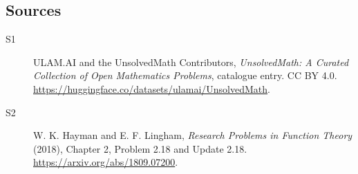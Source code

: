\documentclass[11pt]{article}
\begin{document}
\subsection{Sources}
\begin{description}
\item[\hypertarget{source:statement:1}{S1}] ULAM.AI and the UnsolvedMath Contributors, \emph{UnsolvedMath: A Curated Collection of Open Mathematics Problems}, catalogue entry. CC BY 4.0. \url{https://huggingface.co/datasets/ulamai/UnsolvedMath}.
\item[\hypertarget{source:statement:2}{S2}] W. K. Hayman and E. F. Lingham, \emph{Research Problems in Function Theory} (2018), Chapter 2, Problem 2.18 and Update 2.18. \url{https://arxiv.org/abs/1809.07200}.
\end{description}
\label{end:statement}
\end{document}
